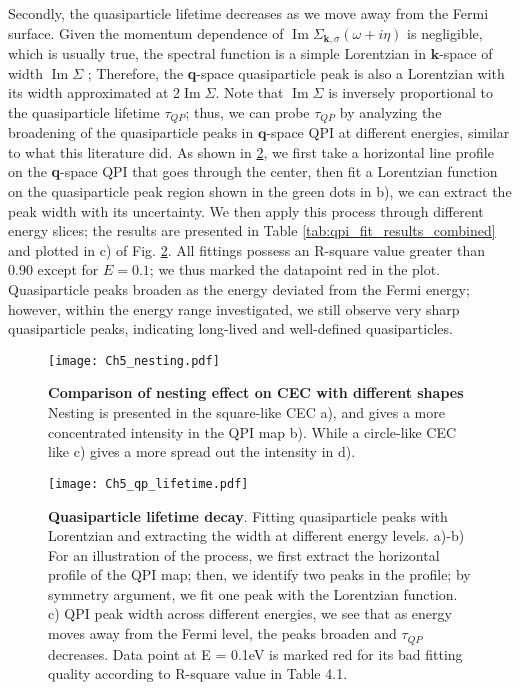 Secondly, the quasiparticle lifetime decreases as we move away from the Fermi surface. Given the momentum dependence of $\operatorname{Im}{\Sigma_{\textbf{k},\sigma}(\omega+i \eta)}$ is negligible, which is usually true, the spectral function is a simple Lorentzian in $\textbf{k}$-space of width $\operatorname{Im}{\Sigma}$ \cite{wolfleQuasiparticlesCondensedMatter2018}; Therefore, the \textbf{q}-space quasiparticle peak is also a Lorentzian with its width approximated at 2$\operatorname{Im}{\Sigma}$. Note that $\operatorname{Im}{\Sigma}$ is inversely proportional to the quasiparticle lifetime $\tau_{QP}$; thus, we can probe $\tau_{QP}$ by analyzing the broadening of the quasiparticle peaks in $\textbf{q}$-space \ac{QPI} at different energies, similar to what this literature did\cite{grotheQuantifyingManyBodyEffects2013a}. As shown in \ref{fig:ch5qplifetime}, we first take a horizontal line profile on the \textbf{q}-space \ac{QPI} that goes through the center, then fit a Lorentzian function on the quasiparticle peak region shown in the green dots in b), we can extract the peak width with its uncertainty. We then apply this process through different energy slices; the results are presented in Table \ref{tab:qpi_fit_results_combined} and plotted in c) of Fig. \ref{fig:ch5qplifetime}. All fittings possess an R-square value greater than 0.90 except for $E=0.1$; we thus marked the datapoint red in the plot. Quasiparticle peaks broaden as the energy deviated from the Fermi energy; however, within the energy range investigated, we still observe very sharp quasiparticle peaks, indicating long-lived and well-defined quasiparticles. 



\begin{figure}
	\texttt{[image: Ch5\_nesting.pdf]} 
	\centering
	\caption[\textbf{Comparison of nesting effect on \ac{CEC} with different shapes}]{\textbf{Comparison of nesting effect on \ac{CEC} with different shapes} Nesting is presented in the square-like \ac{CEC} a), and gives a more concentrated intensity in the QPI map b). While a circle-like \ac{CEC} like c) gives a more spread out the intensity in d).}
	\label{fig:ch5_nest}
\end{figure}


\begin{figure}
	\texttt{[image: Ch5\_qp\_lifetime.pdf]} 
	\centering
	\caption[\textbf{Quasiparticle lifetime decay}]{\textbf{Quasiparticle lifetime decay}. Fitting quasiparticle peaks with Lorentzian and extracting the width at different energy levels. a)-b) For an illustration of the process, we first extract the horizontal profile of the QPI map; then, we identify two peaks in the profile; by symmetry argument, we fit one peak with the Lorentzian function. c) QPI peak width across different energies, we see that as energy moves away from the Fermi level, the peaks broaden and $\tau_{QP}$ decreases. Data point at E = 0.1eV is marked red for its bad fitting quality according to R-square value in Table 4.1.}
	\label{fig:ch5qplifetime}
\end{figure}


